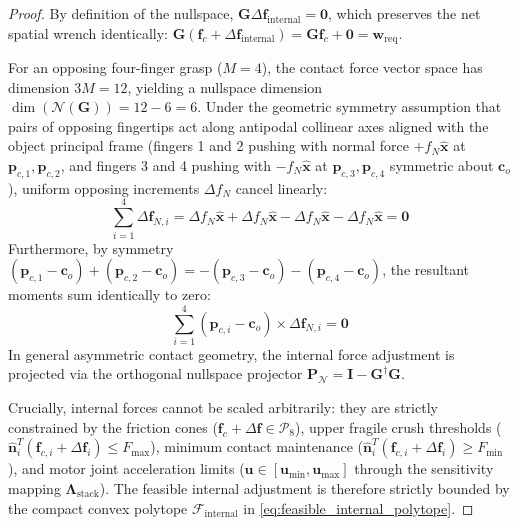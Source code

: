 \begin{proof}
By definition of the nullspace, $\mathbf{G} \Delta \mathbf{f}_{\text{internal}} = \mathbf{0}$, which preserves the net spatial wrench identically: $\mathbf{G}(\mathbf{f}_c + \Delta \mathbf{f}_{\text{internal}}) = \mathbf{G}\mathbf{f}_c + \mathbf{0} = \mathbf{w}_{\text{req}}$. 

For an opposing four-finger grasp ($M = 4$), the contact force vector space has dimension $3M = 12$, yielding a nullspace dimension $\dim(\mathcal{N}(\mathbf{G})) = 12 - 6 = 6$. Under the geometric symmetry assumption that pairs of opposing fingertips act along antipodal collinear axes aligned with the object principal frame (fingers 1 and 2 pushing with normal force $+f_N \hat{\mathbf{x}}$ at $\mathbf{p}_{c, 1}, \mathbf{p}_{c, 2}$, and fingers 3 and 4 pushing with $-f_N \hat{\mathbf{x}}$ at $\mathbf{p}_{c, 3}, \mathbf{p}_{c, 4}$ symmetric about $\mathbf{c}_o$), uniform opposing increments $\Delta f_N$ cancel linearly:
\begin{equation}
    \sum_{i=1}^4 \Delta \mathbf{f}_{N, i} = \Delta f_N \hat{\mathbf{x}} + \Delta f_N \hat{\mathbf{x}} - \Delta f_N \hat{\mathbf{x}} - \Delta f_N \hat{\mathbf{x}} = \mathbf{0}
\end{equation}
Furthermore, by symmetry $(\mathbf{p}_{c, 1} - \mathbf{c}_o) + (\mathbf{p}_{c, 2} - \mathbf{c}_o) = -(\mathbf{p}_{c, 3} - \mathbf{c}_o) - (\mathbf{p}_{c, 4} - \mathbf{c}_o)$, the resultant moments sum identically to zero:
\begin{equation}
    \sum_{i=1}^4 (\mathbf{p}_{c, i} - \mathbf{c}_o) \times \Delta \mathbf{f}_{N, i} = \mathbf{0}
\end{equation}
In general asymmetric contact geometry, the internal force adjustment is projected via the orthogonal nullspace projector $\mathbf{P}_{\mathcal{N}} = \mathbf{I} - \mathbf{G}^\dagger \mathbf{G}$. 

Crucially, internal forces cannot be scaled arbitrarily: they are strictly constrained by the friction cones ($\mathbf{f}_c + \Delta \mathbf{f} \in \mathcal{P}_8$), upper fragile crush thresholds ($\hat{\mathbf{n}}_i^T(\mathbf{f}_{c, i} + \Delta \mathbf{f}_i) \le F_{\max}$), minimum contact maintenance ($\hat{\mathbf{n}}_i^T(\mathbf{f}_{c, i} + \Delta \mathbf{f}_i) \ge F_{\min}$), and motor joint acceleration limits ($\mathbf{u} \in [\mathbf{u}_{\min}, \mathbf{u}_{\max}]$ through the sensitivity mapping $\mathbf{\Lambda}_{\text{stack}}$). The feasible internal adjustment is therefore strictly bounded by the compact convex polytope $\mathcal{F}_{\text{internal}}$ in \eqref{eq:feasible_internal_polytope}.
\end{proof}

